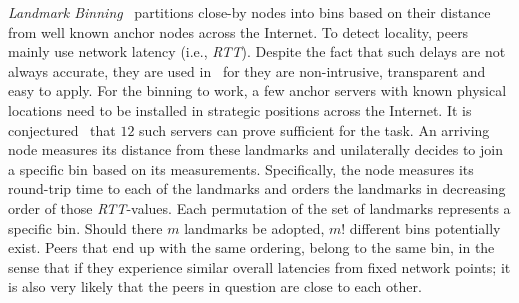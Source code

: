 
\emph{Landmark Binning}~\cite{RHKS2002} partitions close-by nodes
into bins based on their distance from well known anchor nodes across the
Internet.%
To detect locality, peers mainly use network latency (i.e., \emph{RTT}).
Despite the fact that such delays are not always accurate,
they are used in~\cite{RHKS2002} for they are
non-intrusive, transparent and easy to apply.
For the binning to work, a few anchor servers with known
physical locations need to be installed in strategic positions 
across the Internet. 
It is conjectured~\cite{RHKS2002} that $12$ such servers can prove
sufficient for the task.
An arriving node measures its distance from these landmarks
and unilaterally decides to join a specific bin based on its measurements.
%
Specifically, the node measures its round-trip time to each of the landmarks and
orders the landmarks in decreasing order of those \emph{RTT}-values.
Each permutation of the set of landmarks represents a specific bin. 
Should there $m$ landmarks be adopted, $m!$  different bins potentially exist. 
Peers that end up with the same ordering, belong to the same bin, in the sense that
if they experience similar overall latencies from fixed network points; it
is also  very likely that the peers in question are close to each other.

